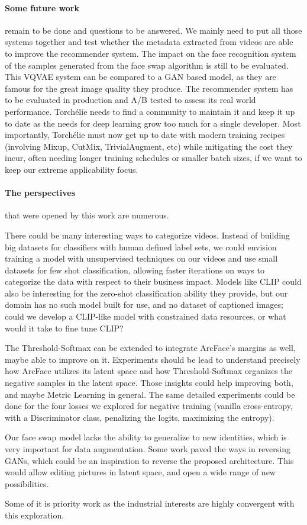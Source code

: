 \paragraph{Some future work} remain to be done and questions to be answered. We mainly need to put all those systems together and test whether the metadata extracted from videos are able to improve the recommender system. The impact on the face recognition system of the samples generated from the face swap algorithm is still to be evaluated. This \ac{VQVAE} system can be compared to a \ac{GAN} based model, as they are famous for the great image quality they produce. The recommender system has to be evaluated in production and A/B tested to assess its real world performance. Torchélie needs to find a community to maintain it and keep it up to date as the needs for deep learning grow too much for a single developer. Most importantly, Torchélie must now get up to date with modern training recipes (involving Mixup, CutMix, TrivialAugment, etc) while mitigating the cost they incur, often needing longer training schedules or smaller batch sizes, if we want to keep our extreme applicability focus.

\paragraph{The perspectives} that were opened by this work are numerous.

There could be many interesting ways to categorize videos. Instead of building big datasets for classifiers with human defined label sets, we could envision training a model with unsupervised techniques on our videos and use small datasets for few shot classification, allowing faster iterations on ways to categorize the data with respect to their business impact. Models like \ac{CLIP} \cite{openaiclip} could also be interesting for the zero-shot classification ability they provide, but our domain has no such model built for use, and no dataset of captioned images; could we develop a \ac{CLIP}-like model with constrained data resources, or what would it take to fine tune CLIP?

The Threshold-Softmax can be extended to integrate ArcFace's margins as well, maybe able to improve on it. Experiments should be lead to understand precisely how ArcFace utilizes its latent space and how Threshold-Softmax organizes the negative samples in the latent space. Those insights could help improving both, and maybe Metric Learning in general. The same detailed experiments could be done for the four losses we explored for negative training (vanilla cross-entropy, with a Discriminator class, penalizing the logits, maximizing the entropy).

Our face swap model lacks the ability to generalize to new identities, which is very important for data augmentation. Some work paved the ways in reversing \acp{GAN}, which could be an inspiration to reverse the proposed architecture. This would allow editing pictures in latent space, and open a wide range of new possibilities.

Some of it is priority work as the industrial interests are highly convergent with this exploration.
